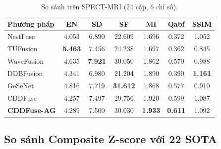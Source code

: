 \documentclass[12pt,a4paper]{article}
\begin{document}
\begin{table}[H]
\centering
\caption{So sánh trên SPECT-MRI (24 cặp, 6 chỉ số).}
\label{tab:sota-spect}
\small
\setlength{\tabcolsep}{4pt}
\begin{tabular}{lcccccc}
\toprule
\textbf{Phương pháp} & \textbf{EN} & \textbf{SD} & \textbf{SF} & \textbf{MI} & \textbf{Qabf} & \textbf{SSIM} \\
\midrule
NestFuse   & 4.053 & 6.890 & 22.609 & 1.696 & 0.372 & 1.052 \\
TUFusion   & \textbf{5.463} & 7.456 & 24.238 & 1.697 & 0.362 & 0.845 \\
WaveFusion & 4.635 & \textbf{7.921} & 30.050 & 1.862 & 0.570 & 0.988 \\
DDBFusion  & 4.341 & 6.980 & 21.204 & 1.890 & 0.390 & \textbf{1.161} \\
GeSeNet    & 4.816 & 7.719 & \textbf{31.612} & 1.868 & 0.577 & 0.910 \\
CDDFuse    & 4.257 & 7.497 & 29.756 & 1.920 & 0.599 & 1.087 \\
\midrule
\textbf{CDDFuse-AG} & 4.289 & 7.500 & 30.030 & \textbf{1.933} & \textbf{0.611} & 1.092 \\
\bottomrule
\end{tabular}
\end{table}

\subsection{So sánh Composite Z-score với 22 SOTA}
\end{document}
